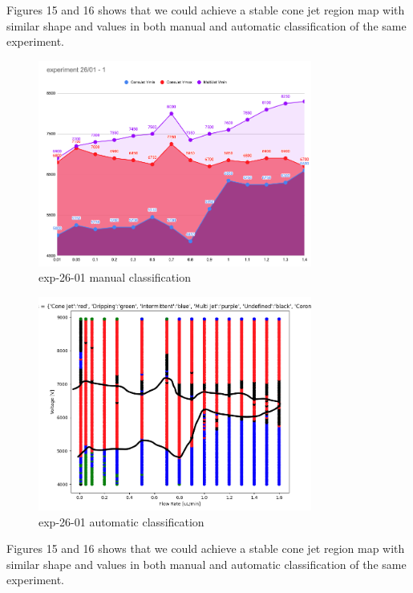         Figures 15 and 16 shows that we could achieve a stable cone jet region map with similar shape and values in both manual and automatic classification of the same experiment.

        \begin{multicols}{2}


            \begin{figure}[H]
                \center
                \includegraphics[width=9cm]{Figuras/report3/manual-mapping.png}
                \caption{ exp-26-01 manual classification}
            \end{figure}

            \begin{figure}[H]
                \center
                \includegraphics[width=9cm]{Figuras/report3/map4-stabilityIsland.png}
                \caption{ exp-26-01 automatic classification}
            \end{figure}

        \end{multicols}

        Figures 15 and 16 shows that we could achieve a stable cone jet region map with similar shape and values in both manual and automatic classification of the same experiment.

